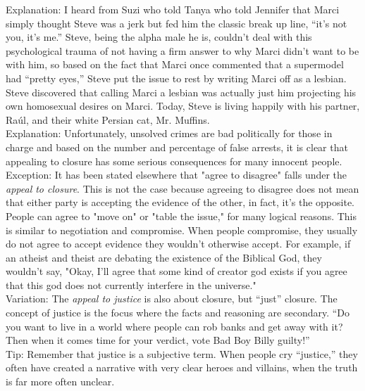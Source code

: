 \documentclass[a4paper,12pt,single,pdftex]{scrartcl}
\begin{document}
{    
      Explanation: I heard from Suzi who told Tanya who told Jennifer that Marci simply thought Steve was a jerk but fed him the classic break up line, “it’s not you, it’s me.” Steve, being the alpha male he is, couldn’t deal with this psychological trauma of not having a firm answer to why Marci didn’t want to be with him, so based on the fact that Marci once commented that a supermodel had “pretty eyes,” Steve put the issue to rest by writing Marci off as a lesbian. Steve discovered that calling Marci a lesbian was actually just him projecting his own homosexual desires on Marci. Today, Steve is living happily with his partner, Raúl, and their white Persian cat, Mr. Muffins.
    \\

    
      Explanation: Unfortunately, unsolved crimes are bad politically for those in charge and based on the number and percentage of false arrests, it is clear that appealing to closure has some serious consequences for many innocent people.
    \\

    
      Exception: It has been stated elsewhere that "agree to disagree" falls under the {\it appeal to closure}. This is not the case because agreeing to disagree does not mean that either party is accepting the evidence of the other, in fact, it's the opposite. People can agree to "move on" or "table the issue," for many logical reasons. This is similar to negotiation and compromise. When people compromise, they usually do not agree to accept evidence they wouldn't otherwise accept. For example, if an atheist and theist are debating the existence of the Biblical God, they wouldn't say, "Okay, I'll agree that some kind of creator god exists if you agree that this god does not currently interfere in the universe."
    \\

    
      Variation: The {\em appeal to justice} is also about closure, but “just” closure. The concept of justice is the focus where the facts and reasoning are secondary. “Do you want to live in a world where people can rob banks and get away with it? Then when it comes time for your verdict, vote Bad Boy Billy guilty!”
    \\

    
      Tip: Remember that justice is a subjective term. When people cry “justice,” they often have created a narrative with very clear heroes and villains, when the truth is far more often unclear.
    \\

  }
\end{document}
